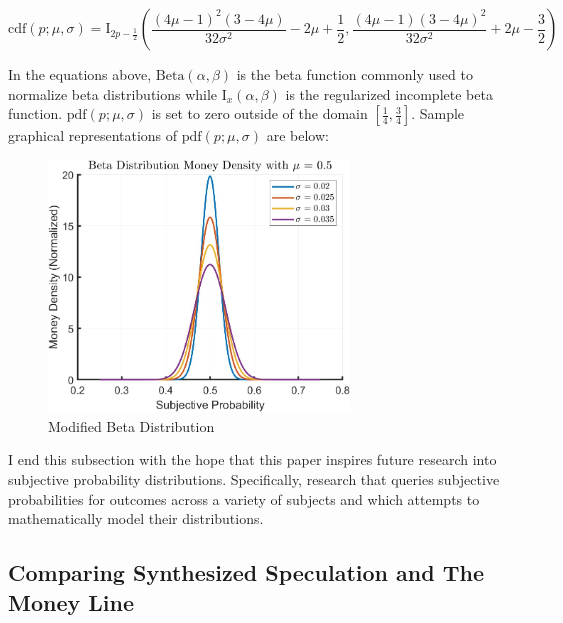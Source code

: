 \documentclass[sn-mathphys-num]{sn-jnl}
\theoremstyle{thmstyleone}%
\theoremstyle{thmstyletwo}%
\theoremstyle{thmstylethree}%
\begin{document}
\begin{equation}
\textrm{cdf}(p;\mu,\sigma) = \textrm{I}_{2p-\frac{1}{2}}({\frac{(4\mu-1)^2(3-4\mu)}{32\sigma^2}-2\mu+\frac{1}{2},\frac{(4\mu-1)(3-4\mu)^2}{32\sigma^2}+2\mu-\frac{3}{2}})
\end{equation}

In the equations above, $\textrm{Beta}(\alpha,\beta)$ is the beta function commonly used to normalize beta distributions while $\textrm{I}_x(\alpha,\beta)$ is the regularized incomplete beta function. $\textrm{pdf}(p;\mu,\sigma)$ is set to zero outside of the domain $[\frac{1}{4}, \frac{3}{4}]$. Sample graphical representations of $\textrm{pdf}(p;\mu,\sigma)$ are below:

\begin{figure}[H]
	\centering
	\includegraphics[width=8cm]{Beta Distribution}
	\caption{Modified Beta Distribution}
\end{figure}

I end this subsection with the hope that this paper inspires future research into subjective probability distributions. Specifically, research that queries subjective probabilities for outcomes across a variety of subjects and which attempts to mathematically model their distributions. 

\subsection{Comparing Synthesized Speculation and The Money Line}
\end{document}

